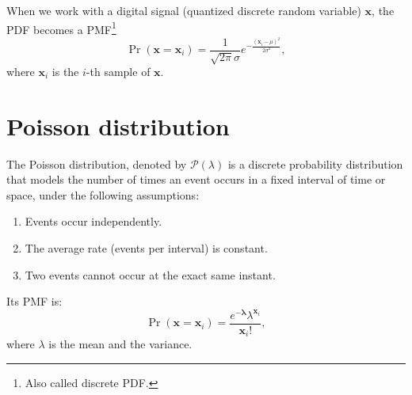 When we work with a digital signal (quantized discrete random
variable) $\mathbf{x}$, the \gls{PDF} becomes a
\gls{PMF}\footnote{Also called discrete \gls{PDF}.}
\begin{equation}
  \Pr(\mathbf{x}{=}\mathbf{x}_i) = \frac{1}{\sqrt{2\pi}\sigma} e^{-\frac{(\mathbf{x}_i-\mu)^2}{2\sigma^2} },
  \label{eq:normal_PMD}
\end{equation}
where $\mathbf{x}_i$ is the $i$-th sample of $\mathbf{x}$.


\section{Poisson distribution}
\label{sec:poisson_distribution}

The Poisson distribution, denoted by $\mathcal{P}(\lambda)$ is a
discrete probability distribution that models the number of times an
event occurs in a fixed interval of time or space, under the following
assumptions:
\begin{enumerate}
\item Events occur independently.
\item The average rate (events per interval) is constant.
\item Two events cannot occur at the exact same instant.
\end{enumerate}
Its \gls{PMF} is:
\begin{equation}
  \Pr(\mathbf{x}{=}\mathbf{x}_i) = \frac{e^{-\mathbf{\lambda}}\lambda^{\mathbf{x}_i}}{\mathbf{x}_i!},
  \label{eq:PN}
\end{equation}
where $\lambda$ is the mean and the variance.




